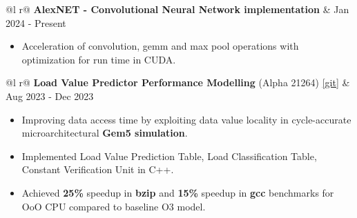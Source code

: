 \documentclass[a4paper,10pt]{article}
\begin{document}
\begin{tabularx}{\linewidth}{ @{}l r@{} }
    \textbf{AlexNET - Convolutional Neural Network implementation } & \hfill {\small Jan 2024 - Present} \\[2.75pt]
    {
        \begin{minipage}[t]{\linewidth}
            \begin{itemize}[nosep,after=\strut, leftmargin=2em, itemsep=3pt]
                \item Acceleration of convolution, gemm and max pool operations with optimization for run time in CUDA.
            \end{itemize}
        \end{minipage}
    }  
\end{tabularx}
\vspace{0.1cm}

\begin{tabularx}{\linewidth}{ @{}l r@{} }
    \textbf{Load Value Predictor Performance Modelling} (Alpha 21264) \href{https://github.com/sharathat45/load_value_predictor/tree/lvp_v1}{[\underline{git}]} 
    & \hfill {\small Aug 2023 - Dec 2023} \\[2.75pt]
    {
        \begin{minipage}[t]{\linewidth}
            \begin{itemize}[nosep, after=\strut, leftmargin=2em, itemsep=3pt]
                \item Improving data access time by exploiting data value locality in cycle-accurate microarchitectural \textbf{Gem5 simulation}. 
                \item Implemented Load Value Prediction Table, Load Classification Table, Constant Verification Unit in C++. 
                \item Achieved \textbf{25\%} speedup in \textbf{bzip} and \textbf{15\%} speedup in \textbf{gcc} benchmarks for OoO CPU compared to baseline O3 model.
            \end{itemize}
        \end{minipage}
    } 
\end{tabularx}
\vspace{0.1cm}
\end{document}
